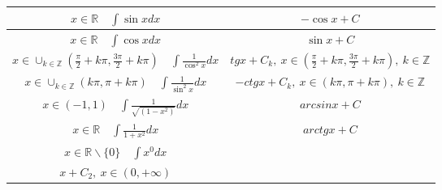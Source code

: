 \documentclass{article}
\begin{document}
\begin{tabular}{ |c|c|  }
    $x \in \mathbb{R} \quad \int \sin x dx                                     $                                                       & $ -\cos x + C$                                                                         \\ \hline
    $x \in \mathbb{R} \quad \int \cos x dx                                     $                                                       & $ \sin x + C$                                                                          \\ \hline
    $x \in \cup_{k \in \mathbb{Z}} (\frac{\pi}{2} + k\pi, \frac{3\pi}{2} + k\pi)\quad \int \frac{1}{\cos^2 x} dx$                      & $ tg x + C_k,\ x \in (\frac{\pi}{2} + k\pi, \frac{3\pi}{2} + k\pi),\ k \in \mathbb{Z}$ \\ \hline
    $x \in \cup_{k \in \mathbb{Z}} (k\pi, \pi + k\pi)\quad \int \frac{1}{\sin^2 x} dx                                                $ & $ -ctg x + C_k,\ x \in (k\pi, \pi + k\pi),\ k \in \mathbb{Z}$                          \\ \hline
    $x \in (-1, 1) \quad \int \frac{1}{\sqrt{(1 - x^2)}} dx                      $                                                     & $ arcsinx + C$                                                                         \\ \hline
    $x \in \mathbb{R} \quad \int \frac{1}{1+x^2} dx                              $                                                     & $ arctg x + C$                                                                         \\ \hline
    $x \in \mathbb{R}\backslash \{0\} \quad \int x^{0} dx$                                                                             &
    \makecell{
    $x + C_1,\ x \in (-\infty, 0)$                                                                                                                                                                                              \\
        $x + C_2,\ x \in (0, +\infty)$
    }                                                                                                                                                                                                                           \\ \hline
\end{tabular}
\end{document}
